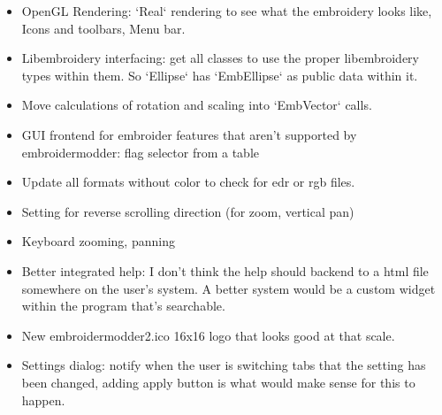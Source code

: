 \begin{itemize}
\item OpenGL Rendering: `Real` rendering to see what the embroidery looks like, Icons and toolbars, Menu bar.
\item Libembroidery interfacing: get all classes to use the proper libembroidery types within them. So `Ellipse` has `EmbEllipse` as public data within it.
\item Move calculations of rotation and scaling into `EmbVector` calls.
\item GUI frontend for embroider features that aren't supported by embroidermodder: flag selector from a table
\item Update all formats without color to check for edr or rgb files.
\item Setting for reverse scrolling direction (for zoom, vertical pan)
\item Keyboard zooming, panning
\item Better integrated help: I don't think the help should backend to a html file somewhere on the user's system. A better system would be a custom widget within the program that's searchable.
\item New embroidermodder2.ico 16x16 logo that looks good at that scale.
\item Settings dialog: notify when the user is switching tabs that the setting has been changed, adding apply button is what would make sense for this to happen.
\end{itemize}

